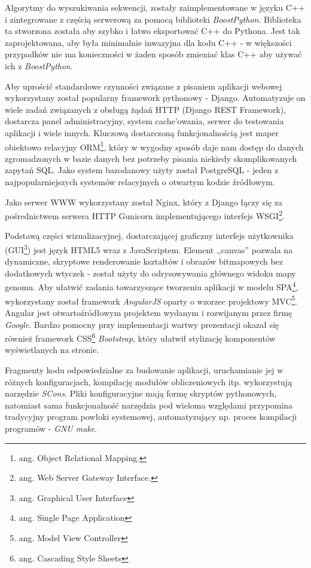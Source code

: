 Algorytmy do wyszukiwania sekwencji, zostały zaimplementowane w języku C++ i zintegrowane z częścią serwerową za pomocą biblioteki \textit{BoostPython}.
Biblioteka ta stworzona została aby szybko i łatwo eksportować C++ do Pythona.
Jest tak zaprojektowana, aby była minimalnie inwazyjna dla kodu C++ - w większości przypadków nie ma konieczności w żaden sposób zmieniać klas C++ aby używać ich z \textit{BoostPython}.

Aby uprościć standardowe czynności związane z pisaniem aplikacji webowej wykorzystany został popularny framework pythonowy - Django. 
Automatyzuje on wiele zadań związanych z obsługą żądań HTTP (Django REST Framework), dostarcza panel administracyjny, system cache'owania, serwer do testowania aplikacji i wiele innych.
Kluczową dostarczoną funkcjonalnością jest maper obiektowo relacyjny ORM\footnote{ang. Object Relational Mapping.}, który w wygodny sposób daje nam dostęp do danych zgromadzonych w bazie danych bez potrzeby pisania niekiedy skomplikowanych zapytań SQL.
Jako system bazodanowy użyty został PostgreSQL - jeden z najpopularniejszych systemów relacyjnych o otwartym kodzie źródłowym.

Jako serwer WWW wykorzystany został Nginx, który z Django łączy się za pośrednictwem serwera HTTP Gunicorn implementującego interfejs WSGI\footnote{ang. Web Server Gateway Interface.}.

Podstawą części wizualizacyjnej, dostarczającej graficzny interfejs użytkownika (GUI\footnote{ang. Graphical User Interface}) jest język HTML5 wraz z JavaScriptem.
Element ,,canvas'' pozwala na dynamiczne, skryptowe renderowanie kształtów i obrazów bitmapowych bez dodatkowych wtyczek - został użyty do odrysowywania głównego widoku mapy genomu.
Aby ułatwić zadania towarzyszące tworzeniu aplikacji w modelu SPA\footnote{ang. Single Page Application}, wykorzystany został framework \textit{AngularJS} oparty o wzorzec projektowy MVC\footnote{ang. Model View Controller}.
Angular jest otwartoźródłowym projektem wydanym i rozwijanym przez firmę \textit{Google}.
Bardzo pomocny przy implementacji wartwy prezentacji okazał się również framework CSS\footnote{ang. Cascading Style Sheets} \textit{Bootstrap}, który ułatwił stylizację komponentów wyświetlanych na stronie.

Fragmenty kodu odpowiedzialne za budowanie aplikacji, uruchamianie jej w różnych konfiguracjach, kompilację modułów obliczeniowych itp. wykorzystują narzędzie \textit{SCons}.
Pliki konfiguracyjne mają formę skryptów pythonowych, natomiast sama funkcjonalność narzędzia pod wieloma względami przypomina tradycyjny program powłoki systemowej, automatyzujący np. proces kompilacji programów - \textit{GNU make}.

